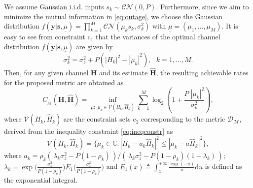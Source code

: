 \documentclass{article}
\begin{document}
We assume Gaussian i.i.d. inputs $s_k \sim \mathcal{CN}(0,P)$. Furthermore, since we aim to minimize the mutual information in \eqref{eq:outage}, we choose the Gaussian distribution  $f(\mathbf{y}|\mathbf{s},\underline{\mu})=\prod_{k=1}^M \mathcal{CN}(\mu_k s_k,\sigma^2_k)$ with $\underline{\mu}=(\mu_1,\dots,\mu_M)$. It is easy to see from constraint $\mathrm{c_1}$ that the variances of the optimal channel distribution $f(\mathbf{y}|\mathbf{s},\underline{\mu})$ are given by
\begin{equation}
\sigma^2_k = \sigma^2_z + P(|H_k|^2-|\mu_k|^2),\,\,\,\,k=1,\dots,M.  
\end{equation} 
Then, for any given channel $\mathbf{H}$ and its estimate $\widehat{\mathbf{H}}$, the resulting achievable rates for the proposed metric are obtained as 
\begin{equation}
\label{eq:CM}
C_{_\mathcal{M}}(\mathbf{H},\widehat{\mathbf{H}})=\!\!\!\!\! \!\!\!\!\!\inf_{\underline{\mu}: \,\,\mu_k\in \mathcal{V}(H_k,\widehat{H}_k)}\sum\limits_{k=1}^{M} \log_2\left(1+\frac{P\;|\mu_k|^2}{\sigma^2_k}\right),
\end{equation}
where $\mathcal{V}(H_k,\widehat{H}_k)$ are the constraint sets $\mathrm{c_2}$ corresponding to the metric $\mathcal{D}_{\mathcal{M}}$, derived from the inequality constraint \eqref{eq:ineqconstr} as
\begin{equation}
\label{ineqconstr2}
\mathcal{V}(H_k,\widehat{H}_k)=\big\{\mu_k \in \mathbb{C}:|H_k-a_k \widehat{H}_k |^2 \leq |\mu_k-a\widehat{H}_k|^2\big \},
\end{equation}
where $a_k=\rho_k(\, \lambda_k \sigma^2_z -P(1-\rho_k)\,)/(\, \lambda_k \sigma^2_z-P(1-\rho_k)(1-\lambda_k)\,)$; \\
$\lambda_k=\exp \big( \frac{\sigma^2_z}{P(1-\rho_k)}\big) E_1\big(\frac{\sigma^2_z}{P(1-\rho_k)}\big)$ and $E_1(x) \triangleq \int^{+\infty}_{x} \frac{\exp(-u)}{u} \mathrm{d}u$ is defined as the exponential integral. 
\end{document}
